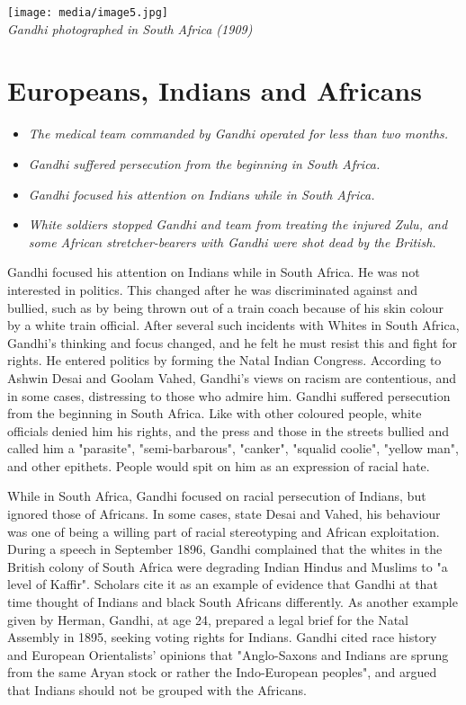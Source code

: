 \texttt{[image: media/image5.jpg]}\\
\emph{Gandhi photographed in South Africa (1909)}

\section{Europeans, Indians and
Africans}\label{europeans-indians-and-africans}

\begin{itemize}
\item
  \emph{The medical team commanded by Gandhi operated for less than two
  months.}
\item
  \emph{Gandhi suffered persecution from the beginning in South Africa.}
\item
  \emph{Gandhi focused his attention on Indians while in South Africa.}
\item
  \emph{White soldiers stopped Gandhi and team from treating the injured
  Zulu, and some African stretcher-bearers with Gandhi were shot dead by
  the British.}
\end{itemize}

Gandhi focused his attention on Indians while in South Africa. He was
not interested in politics. This changed after he was discriminated
against and bullied, such as by being thrown out of a train coach
because of his skin colour by a white train official. After several such
incidents with Whites in South Africa, Gandhi's thinking and focus
changed, and he felt he must resist this and fight for rights. He
entered politics by forming the Natal Indian Congress. According to
Ashwin Desai and Goolam Vahed, Gandhi's views on racism are contentious,
and in some cases, distressing to those who admire him. Gandhi suffered
persecution from the beginning in South Africa. Like with other coloured
people, white officials denied him his rights, and the press and those
in the streets bullied and called him a "parasite", "semi-barbarous",
"canker", "squalid coolie", "yellow man", and other epithets. People
would spit on him as an expression of racial hate.

While in South Africa, Gandhi focused on racial persecution of Indians,
but ignored those of Africans. In some cases, state Desai and Vahed, his
behaviour was one of being a willing part of racial stereotyping and
African exploitation. During a speech in September 1896, Gandhi
complained that the whites in the British colony of South Africa were
degrading Indian Hindus and Muslims to "a level of Kaffir". Scholars
cite it as an example of evidence that Gandhi at that time thought of
Indians and black South Africans differently. As another example given
by Herman, Gandhi, at age 24, prepared a legal brief for the Natal
Assembly in 1895, seeking voting rights for Indians. Gandhi cited race
history and European Orientalists' opinions that "Anglo-Saxons and
Indians are sprung from the same Aryan stock or rather the Indo-European
peoples", and argued that Indians should not be grouped with the
Africans.

